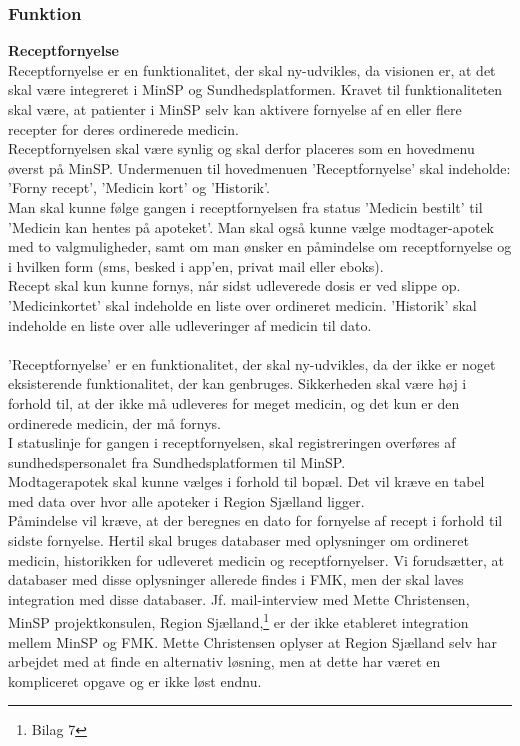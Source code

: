 \subsubsection{Funktion}
\textbf{Receptfornyelse}\\
Receptfornyelse er en funktionalitet, der skal ny-udvikles, da visionen er, at det skal være integreret i MinSP og Sundhedsplatformen. Kravet til funktionaliteten skal være, at patienter i MinSP selv kan aktivere fornyelse af en eller flere recepter for deres ordinerede medicin. 
\\
Receptfornyelsen skal være synlig og skal derfor placeres som en hovedmenu øverst på MinSP. Undermenuen til hovedmenuen 'Receptfornyelse' skal indeholde: 'Forny recept', 'Medicin kort' og 'Historik'.
\\
Man skal kunne følge gangen i receptfornyelsen fra status 'Medicin bestilt' til 'Medicin kan hentes på apoteket'. Man skal også kunne vælge modtager-apotek med to valgmuligheder, samt om man ønsker en påmindelse om receptfornyelse og i hvilken form (sms, besked i app'en, privat mail eller eboks). 
\\ 
Recept skal kun kunne fornys, når sidst udleverede dosis er ved slippe op.  
\\
'Medicinkortet' skal indeholde en liste over ordineret medicin.
'Historik' skal indeholde en liste over alle udleveringer af medicin til dato.
\\\\
'Receptfornyelse' er en funktionalitet, der skal ny-udvikles, da der ikke er noget eksisterende funktionalitet, der kan genbruges. Sikkerheden skal være høj i forhold til, at der ikke må udleveres for meget medicin, og det kun er den ordinerede medicin, der må fornys. \\
I statuslinje for gangen i receptfornyelsen, skal registreringen overføres af sundhedspersonalet fra Sundhedsplatformen til MinSP.\\
Modtagerapotek skal kunne vælges i forhold til bopæl. Det vil kræve en tabel med data over hvor alle apoteker i Region Sjælland ligger.\\
Påmindelse vil kræve, at der beregnes en dato for fornyelse af recept i forhold til sidste fornyelse. Hertil skal bruges databaser med oplysninger om ordineret medicin, historikken for udleveret medicin og receptfornyelser. Vi forudsætter, at databaser med disse oplysninger allerede findes i FMK, men der skal laves integration med disse databaser. Jf. mail-interview med Mette Christensen, MinSP projektkonsulen, Region Sjælland,\footnote{Bilag 7} er der ikke etableret integration mellem MinSP og FMK. Mette Christensen oplyser at Region Sjælland selv har arbejdet med at finde en alternativ løsning, men at dette har været en kompliceret opgave og er ikke løst endnu. \\
